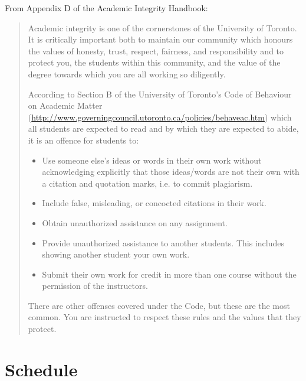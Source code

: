 \documentclass{article}
\begin{document}
From Appendix D of the Academic Integrity Handbook:
\begin{quote}
  Academic integrity is one of the cornerstones of the University of
  Toronto. It is critically important both to maintain our community
  which honours the values of honesty, trust, respect, fairness, and
  responsibility and to protect you, the students within this
  community, and the value of the degree towards which you are all
  working so diligently.  

  According to Section B of the University of
  Toronto's Code of Behaviour on Academic Matter
  (\url{http://www.governingcouncil.utoronto.ca/policies/behaveac.htm})
  which all students are expected to read and by which they are
  expected to abide, it is an offence for students to:
  \begin{itemize}
    \item Use someone else's ideas or words in their own work without
      acknowledging explicitly that those ideas/words are not their
      own with a citation and quotation marks, i.e. to commit
      plagiarism.
  \item Include false, misleading, or concocted citations in their
    work.
  \item Obtain unauthorized assistance on any assignment. 
  \item Provide unauthorized assistance to another students. This
    includes showing another student your own work.
  \item Submit their own work for credit in more than one course
      without the permission of the instructors.
  \end{itemize}

  There are other offenses covered under the Code, but these are the
  most common. You are instructed to respect these rules and the
  values that they protect.
\end{quote}

\section*{Schedule}
\end{document}
